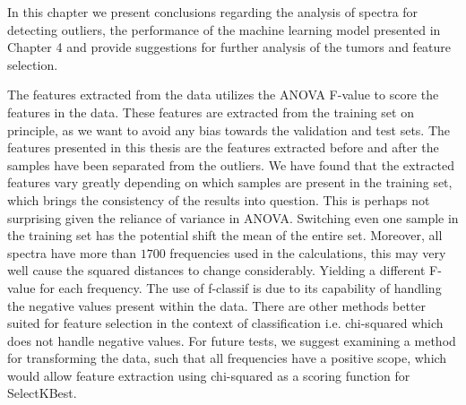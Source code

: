 
In this chapter we present conclusions regarding the analysis of spectra for detecting outliers, the performance of the machine learning model presented in Chapter 4 and provide suggestions for further analysis of the tumors and feature selection.

The features extracted from the data utilizes the ANOVA F-value to score the features in the data. These features are extracted from the training set on principle, as we want to avoid any bias towards the validation and test sets. The features presented in this thesis are the features extracted before and after the samples have been separated from the outliers. We have found that the extracted features vary greatly depending on which samples are present in the training set, which brings the consistency of the results into question. This is perhaps not surprising given the reliance of variance in ANOVA. Switching even one sample in the training set has the potential shift the mean of the entire set. Moreover, all spectra have more than $1700$ frequencies used in the calculations, this may very well cause the squared distances to change considerably. Yielding a different F-value for each frequency. The use of f-classif is due to its capability of handling the negative values present within the data. There are other methods better suited for feature selection in the context of classification i.e. chi-squared which does not handle negative values. For future tests, we suggest examining a method for transforming the data, such that all frequencies have a positive scope, which would allow feature extraction using chi-squared as a scoring function for SelectKBest.

